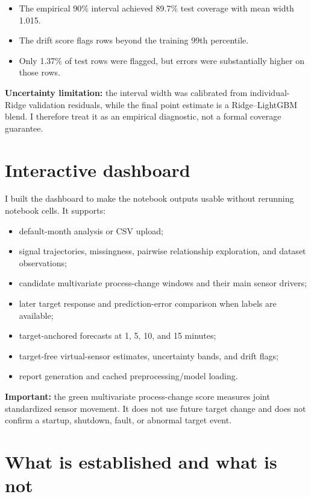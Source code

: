 \documentclass[10pt,a4paper]{article}
\begin{document}
\begin{itemize}
  \item The empirical 90\% interval achieved 89.7\% test coverage with mean width 1.015.
  \item The drift score flags rows beyond the training 99th percentile.
  \item Only 1.37\% of test rows were flagged, but errors were substantially higher on those rows.
\end{itemize}

\textbf{Uncertainty limitation:} the interval width was calibrated from individual-Ridge validation residuals, while the final point estimate is a Ridge--LightGBM blend. I therefore treat it as an empirical diagnostic, not a formal coverage guarantee.

\section{Interactive dashboard}

I built the dashboard to make the notebook outputs usable without rerunning notebook cells. It supports:
\begin{itemize}
  \item default-month analysis or CSV upload;
  \item signal trajectories, missingness, pairwise relationship exploration, and dataset observations;
  \item candidate multivariate process-change windows and their main sensor drivers;
  \item later target response and prediction-error comparison when labels are available;
  \item target-anchored forecasts at 1, 5, 10, and 15 minutes;
  \item target-free virtual-sensor estimates, uncertainty bands, and drift flags;
  \item report generation and cached preprocessing/model loading.
\end{itemize}

\textbf{Important:} the green multivariate process-change score measures joint standardized sensor movement. It does not use future target change and does not confirm a startup, shutdown, fault, or abnormal target event.

\section{What is established and what is not}
\end{document}
